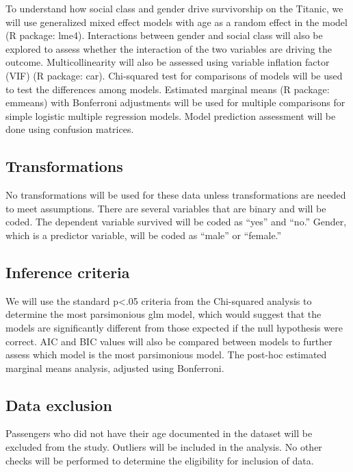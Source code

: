\documentclass[]{article}
\begin{document}
To understand how social class and gender drive survivorship on the
Titanic, we will use generalized mixed effect models with age as a
random effect in the model (R package: lme4). Interactions between
gender and social class will also be explored to assess whether the
interaction of the two variables are driving the outcome.
Multicollinearity will also be assessed using variable inflation factor
(VIF) (R package: car). Chi-squared test for comparisons of models will
be used to test the differences among models. Estimated marginal means
(R package: emmeans) with Bonferroni adjustments will be used for
multiple comparisons for simple logistic multiple regression models.
Model prediction assessment will be done using confusion matrices.

\hypertarget{transformations}{%
\subsection{Transformations}\label{transformations}}

No transformations will be used for these data unless transformations
are needed to meet assumptions. There are several variables that are
binary and will be coded. The dependent variable survived will be coded
as ``yes'' and ``no.'' Gender, which is a predictor variable, will be
coded as ``male'' or ``female.''

\hypertarget{inference-criteria}{%
\subsection{Inference criteria}\label{inference-criteria}}

We will use the standard p\textless.05 criteria from the Chi-squared
analysis to determine the most parsimonious glm model, which would
suggest that the models are significantly different from those expected
if the null hypothesis were correct. AIC and BIC values will also be
compared between models to further assess which model is the most
parsimonious model. The post-hoc estimated marginal means analysis,
adjusted using Bonferroni.

\hypertarget{data-exclusion}{%
\subsection{Data exclusion}\label{data-exclusion}}

Passengers who did not have their age documented in the dataset will be
excluded from the study. Outliers will be included in the analysis. No
other checks will be performed to determine the eligibility for
inclusion of data.
\end{document}
